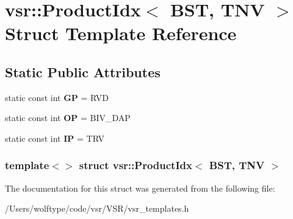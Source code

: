 \hypertarget{structvsr_1_1_product_idx_3_01_b_s_t_00_01_t_n_v_01_4}{\section{vsr\-:\-:Product\-Idx$<$ B\-S\-T, T\-N\-V $>$ Struct Template Reference}
\label{structvsr_1_1_product_idx_3_01_b_s_t_00_01_t_n_v_01_4}
}
\subsection*{Static Public Attributes}
\begin{DoxyCompactItemize}
\item 
\hypertarget{structvsr_1_1_product_idx_3_01_b_s_t_00_01_t_n_v_01_4_a1c6fbcf6427f7b05e8a77d9ef6b4daea}{static const int {\bfseries G\-P} = R\-V\-D}\label{structvsr_1_1_product_idx_3_01_b_s_t_00_01_t_n_v_01_4_a1c6fbcf6427f7b05e8a77d9ef6b4daea}

\item 
\hypertarget{structvsr_1_1_product_idx_3_01_b_s_t_00_01_t_n_v_01_4_a5b36f4eb3833637b1c9ba23d45d2c319}{static const int {\bfseries O\-P} = B\-I\-V\-\_\-\-D\-A\-P}\label{structvsr_1_1_product_idx_3_01_b_s_t_00_01_t_n_v_01_4_a5b36f4eb3833637b1c9ba23d45d2c319}

\item 
\hypertarget{structvsr_1_1_product_idx_3_01_b_s_t_00_01_t_n_v_01_4_ad03c93816ed45a8c1d55f1f8af0d9b3b}{static const int {\bfseries I\-P} = T\-R\-V}\label{structvsr_1_1_product_idx_3_01_b_s_t_00_01_t_n_v_01_4_ad03c93816ed45a8c1d55f1f8af0d9b3b}

\end{DoxyCompactItemize}
\subsubsection*{template$<$$>$ struct vsr\-::\-Product\-Idx$<$ B\-S\-T, T\-N\-V $>$}



The documentation for this struct was generated from the following file\-:\begin{DoxyCompactItemize}
\item 
/\-Users/wolftype/code/vsr/\-V\-S\-R/vsr\-\_\-templates.\-h\end{DoxyCompactItemize}
